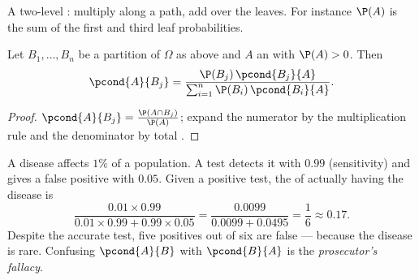 \begin{omfigure}

{\small A two-level : multiply along a path, add over the leaves.
For instance $\P(A)$ is the sum of the first and third leaf
probabilities.}
\end{omfigure}

\begin{theorem}\label{thm:g12:condprob:bayes}
Let $B_1, \dots, B_n$ be a partition of $\Omega$ as above and $A$ an 
with $\P(A) > 0$. Then
\[
\pcond{A}{B_j} =
\frac{\P(B_j)\,\pcond{B_j}{A}}{\sum_{i=1}^{n} \P(B_i)\,\pcond{B_i}{A}} .
\]
\end{theorem}

\begin{proof}
$\pcond{A}{B_j} = \frac{\P(A \cap B_j)}{\P(A)}$; expand the numerator by
the multiplication rule and the denominator by total .
\end{proof}

\begin{example}\label{ex:g12:condprob:test}
A disease affects $1\%$ of a population. A test detects it with 
$0.99$ (sensitivity) and gives a false positive with  $0.05$.
Given a positive test, the  of actually having the disease is
\[
\frac{0.01 \times 0.99}{0.01\times0.99 + 0.99\times0.05}
= \frac{0.0099}{0.0099 + 0.0495} = \frac{1}{6} \approx 0.17 .
\]
Despite the accurate test, five positives out of six are false --- because
the disease is rare. Confusing $\pcond{A}{B}$ with $\pcond{B}{A}$ is the
\emph{prosecutor's fallacy}.
\end{example}

